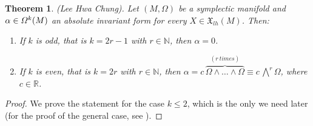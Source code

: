 \documentclass[12pt]{report}
\newtheorem{teor}{Theorem}[chapter]
\def\vf{\mathfrak X}
\def\Real{\mathbb{R}}
\def\Nat{\mathbb{N}}
\begin{document}
\begin{teor} {\rm (Lee Hwa Chung)}.
Let $(M,\Omega )$ be a symplectic manifold
and $\alpha \in {\mit\Omega}^k(M)$ an absolute invariant form for 
every $X \in \vf_{lh}(M)$. Then:
\begin{enumerate}
\item
If $k$ is odd, that is $k=2r-1$ with $r\in\Nat$, then
$\alpha = 0$.
\item
If $k$ is even, that is $k=2r$ with $r\in\Nat$, then
$\displaystyle\alpha = c\,\overbrace{\Omega\wedge\ldots\wedge\Omega}^{(r\ times)}
\equiv c \,\bigwedge^r\Omega$,
where $c \in \Real$.
\end{enumerate}
\end{teor}
\begin{proof}
We prove the statement for the case $k\leq 2$, which is the only we need later
(for the proof of the general  case, see  \cite{LlR-88}).


\end{proof}
\end{document}

